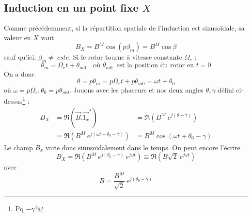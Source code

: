 	\subsection{Induction en un point fixe $X$}
	Comme précédemment, si la répartition spatiale de l'induction est sinusoïdale, 
	sa valeur en $X$ vaut 
	\begin{equation}
	B_X = B^M\cos(p\beta_m) = B^M\cos\beta
	\end{equation}
	sauf qu'ici, $\beta_m \neq\ cste$. Si le rotor tourne à vitesse constante 
	$\Omega_r$ :
	\begin{equation}
	\theta_m = \Omega_rt + \theta_{m0}\quad \text{où } \theta_{m0}\ \text{ est 
	la position du rotor en $t=0$}
	\end{equation}
	On a donc
	\begin{equation}
	\theta = p\theta_m = p\Omega_rt + p\theta_{m0} = \omega t +\theta_0
	\end{equation}
	où $\omega = p\Omega_r, \theta_0=p\theta_{m0}$. Jouons avec les phaseurs 
	et nos deux angles $\theta, \gamma$ défini ci-dessus\footnote{Pq $-\gamma$?} :
	\begin{equation}
	\begin{array}{lll}
	B_X &= \Re(\vec{B}.\vec{1_x}^*) &= \Re(B^M\ e^{j(\theta-\gamma)})\\
	&= \Re(B^M\ e^{j(\omega t + \theta_0-\gamma)}) &= B^M\cos(\omega t+\theta_0
	-\gamma)
	\end{array}
	\end{equation}
	Le champ $B_x$ varie donc sinusoïdalement dans le temps. On peut encore 
	l'écrire 
	\begin{equation}
	B_X = \Re(B^M\ e^{j(\theta_0-\gamma)}\ e^{j\omega t}) \equiv \Re(\underline{B}
	\sqrt{2}\ e^{j\omega t})
	\end{equation}
	avec 
	\begin{equation}
	\underline{B} = \dfrac{B^M}{\sqrt{2}}\ e^{j(\theta_0-\gamma)}
	\end{equation}
	

